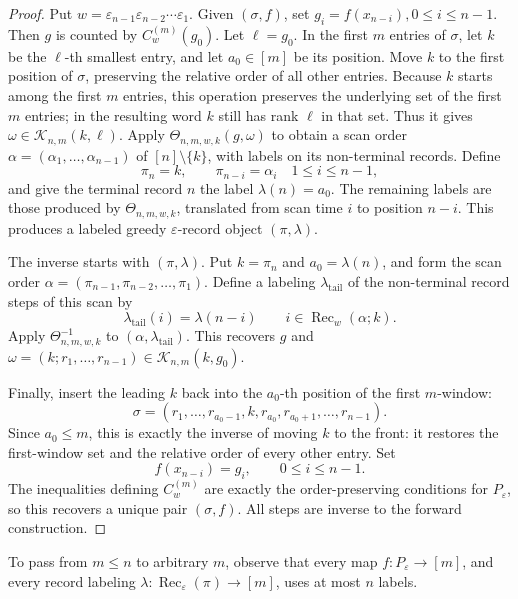 \documentclass[10pt,a4paper]{amsart}
\newcommand{\eps}{\varepsilon}
\begin{document}
\begin{proof}
Put $w=\eps_{n-1}\eps_{n-2}\cdots\eps_1$. Given \((\sigma,f)\), set $g_i=f(x_{n-i}), 0\le i\le n-1$. Then \(g\) is counted by \(C_w^{(m)}(g_0)\).  Let \(\ell=g_0\).  In the first
\(m\) entries of \(\sigma\), let \(k\) be the \(\ell\)-th smallest entry, and
let \(a_0\in[m]\) be its position.  Move \(k\) to the first position of
\(\sigma\), preserving the relative order of all other entries.  Because \(k\)
starts among the first \(m\) entries, this operation preserves the underlying
set of the first \(m\) entries; in the resulting word \(k\) still has rank
\(\ell\) in that set.  Thus it gives $\omega\in\mathcal K_{n,m}(k,\ell)$. Apply $\Theta_{n,m,w,k}(g,\omega)$ to obtain a scan order $\alpha=(\alpha_1,\ldots,\alpha_{n-1})$
of \([n]\setminus\{k\}\), with labels on its non-terminal records.  Define
\[
\pi_n=k,\qquad
\pi_{n-i}=\alpha_i\quad1\le i\le n-1,
\]
and give the terminal record \(n\) the label $\lambda(n)=a_0$.
The remaining labels are those produced by \(\Theta_{n,m,w,k}\), translated
from scan time \(i\) to position \(n-i\).  This produces a labeled greedy
\(\eps\)-record object \((\pi,\lambda)\).

The inverse starts with \((\pi,\lambda)\).  Put \(k=\pi_n\) and
\(a_0=\lambda(n)\), and form the scan order $\alpha=(\pi_{n-1},\pi_{n-2},\ldots,\pi_1)$. Define a labeling \(\lambda_{\mathrm{tail}}\) of the non-terminal record steps
of this scan by
\[
\lambda_{\mathrm{tail}}(i)=\lambda(n-i)
\qquad
i\in \operatorname{Rec}_w(\alpha;k).
\]
Apply \(\Theta_{n,m,w,k}^{-1}\) to
\((\alpha,\lambda_{\mathrm{tail}})\).  This recovers \(g\) and $\omega=(k;r_1,\ldots,r_{n-1})\in\mathcal K_{n,m}(k,g_0)$.

Finally, insert the leading \(k\) back into the \(a_0\)-th position of the
first \(m\)-window:
\[
\sigma=(r_1,\ldots,r_{a_0-1},k,r_{a_0},r_{a_0+1},\ldots,r_{n-1}).
\]
Since \(a_0\le m\), this is exactly the inverse of moving \(k\) to the front:
it restores the first-window set and the relative order of every other entry.
Set
\[
f(x_{n-i})=g_i,\qquad 0\le i\le n-1.
\]
The inequalities defining \(C_w^{(m)}\) are exactly the order-preserving
conditions for \(P_\eps\), so this recovers a unique pair \((\sigma,f)\).
All steps are inverse to the forward construction.
\end{proof}

To pass from \(m\le n\) to arbitrary \(m\), observe that every map
\(f:P_\eps\to[m]\), and every record labeling
\(\lambda:\operatorname{Rec}_\eps(\pi)\to[m]\), uses at most \(n\) labels.
\end{document}
